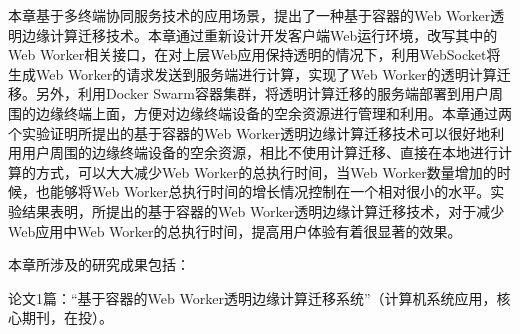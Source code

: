 本章基于多终端协同服务技术的应用场景，提出了一种基于容器的Web Worker透明边缘计算迁移技术。本章通过重新设计开发客户端Web运行环境，改写其中的Web Worker相关接口，在对上层Web应用保持透明的情况下，利用WebSocket将生成Web Worker的请求发送到服务端进行计算，实现了Web Worker的透明计算迁移。另外，利用Docker Swarm容器集群，将透明计算迁移的服务端部署到用户周围的边缘终端上面，方便对边缘终端设备的空余资源进行管理和利用。本章通过两个实验证明所提出的基于容器的Web Worker透明边缘计算迁移技术可以很好地利用用户周围的边缘终端设备的空余资源，相比不使用计算迁移、直接在本地进行计算的方式，可以大大减少Web Worker的总执行时间，当Web Worker数量增加的时候，也能够将Web Worker总执行时间的增长情况控制在一个相对很小的水平。实验结果表明，所提出的基于容器的Web Worker透明边缘计算迁移技术，对于减少Web应用中Web Worker的总执行时间，提高用户体验有着很显著的效果。

本章所涉及的研究成果包括：

论文1篇：“基于容器的Web Worker透明边缘计算迁移系统”（计算机系统应用，核心期刊，在投）。